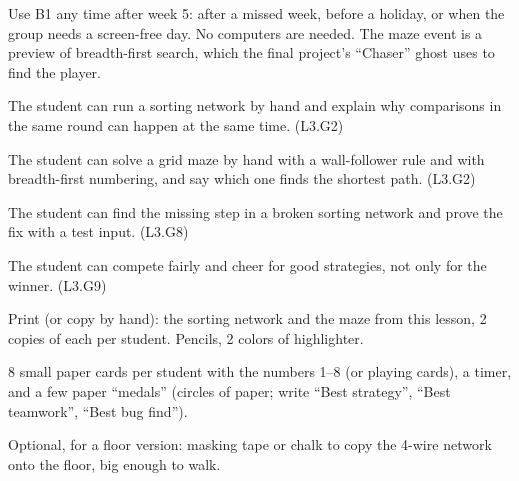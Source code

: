 
\begin{teachernote}
Use B1 any time after week 5: after a missed week, before a holiday, or when the group needs a screen-free day. No computers are needed. The maze event is a preview of breadth-first search, which the final project's \enquote{Chaser} ghost uses to find the player.
\end{teachernote}

\begin{objectives}
  \item The student can run a sorting network by hand and explain why comparisons in the same round can happen at the same time. (L3.G2)
  \item The student can solve a grid maze by hand with a wall-follower rule and with breadth-first numbering, and say which one finds the shortest path. (L3.G2)
  \item The student can find the missing step in a broken sorting network and prove the fix with a test input. (L3.G8)
  \item The student can compete fairly and cheer for good strategies, not only for the winner. (L3.G9)
\end{objectives}

\begin{materials}
  \item Print (or copy by hand): the sorting network and the maze from this lesson, 2 copies of each per student. Pencils, 2 colors of highlighter.
  \item 8 small paper cards per student with the numbers 1--8 (or playing cards), a timer, and a few paper \enquote{medals} (circles of paper; write \enquote{Best strategy}, \enquote{Best teamwork}, \enquote{Best bug find}).
  \item Optional, for a floor version: masking tape or chalk to copy the 4-wire network onto the floor, big enough to walk.
\end{materials}

